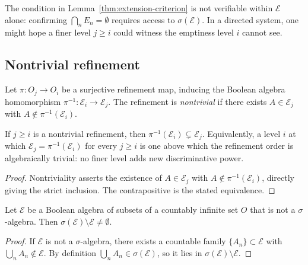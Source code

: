 \noindent The condition in Lemma~\ref{thm:extension-criterion} is not verifiable
within $\mathcal{E}$ alone: confirming $\bigcap_n E_n = \emptyset$ requires access to $\sigma(\mathcal{E})$.  In a directed system, one might hope a finer level $j \geq i$ could witness the emptiness level $i$ cannot see.

\subsection{Nontrivial refinement}
\label{sec:incompleteness}

\begin{definition}
Let $\pi : O_j \to O_i$ be a surjective refinement map, inducing the Boolean algebra homomorphism $\pi^{-1} : \mathcal{E}_i \to \mathcal{E}_j$.  The refinement is \emph{nontrivial} if there exists $A \in \mathcal{E}_j$ with $A \notin \pi^{-1}(\mathcal{E}_i)$.
\end{definition}

\begin{proposition}
\label{prop:nontrivial}
If $j \geq i$ is a nontrivial refinement, then $\pi^{-1}(\mathcal{E}_i)
\subsetneq \mathcal{E}_j$.  Equivalently, a level $i$ at which
$\mathcal{E}_j = \pi^{-1}(\mathcal{E}_i)$ for every $j \geq i$ is one above which the refinement order is algebraically trivial: no finer level adds new discriminative power.
\end{proposition}

\begin{proof}
Nontriviality asserts the existence of $A \in \mathcal{E}_j$ with $A \notin \pi^{-1}(\mathcal{E}_i)$, directly giving the strict inclusion. The contrapositive is the stated equivalence.
\end{proof}

\begin{lemma}
\label{prop:gap-nonempty}
Let $\mathcal{E}$ be a Boolean algebra of subsets of a countably infinite set $O$ that is not a $\sigma$-algebra.  Then $\sigma(\mathcal{E}) \setminus \mathcal{E} \neq \emptyset$.
\end{lemma}

\begin{proof}
If $\mathcal{E}$ is not a $\sigma$-algebra, there exists a countable family $\{A_n\} \subset \mathcal{E}$ with $\bigcup_n A_n \notin \mathcal{E}$.  By definition $\bigcup_n A_n \in \sigma(\mathcal{E})$, so it lies in $\sigma(\mathcal{E}) \setminus \mathcal{E}$.
\end{proof}

